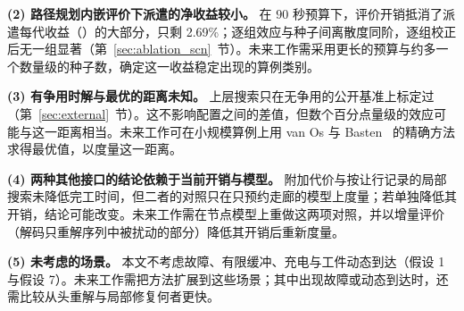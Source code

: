 \documentclass[manuscript,screen,review]{acmart}
\newcommand{\GainProbeLoop}{2.69\%}      %
\begin{document}
\textbf{(2) 路径规划内嵌评价下派遣的净收益较小。}
在 $90$ 秒预算下，评价开销抵消了派遣每代收益（\SameGenGainAbs{}）的大部分，只剩 \GainProbeLoop{}；逐组效应与种子间离散度同阶，逐组校正后无一组显著（第~\ref{sec:ablation_scn}~节）。未来工作需采用更长的预算与约多一个数量级的种子数，确定这一收益稳定出现的算例类别。

\textbf{(3) 有争用时解与最优的距离未知。}
上层搜索只在无争用的公开基准上标定过（第~\ref{sec:external}~节）。这不影响配置之间的差值，但数个百分点量级的效应可能与这一距离相当。未来工作可在小规模算例上用 van Os 与 Basten~\cite{vanos2026exact} 的精确方法求得最优值，以度量这一距离。

\textbf{(4) 两种其他接口的结论依赖于当前开销与模型。}
附加代价与按让行记录的局部搜索未降低完工时间，但二者的对照只在只预约走廊的模型上度量；若单独降低其开销，结论可能改变。未来工作需在节点模型上重做这两项对照，并以增量评价（解码只重解序列中被扰动的部分）降低其开销后重新度量。

\textbf{(5) 未考虑的场景。}
本文不考虑故障、有限缓冲、充电与工件动态到达（假设 1 与假设 7）。未来工作需把方法扩展到这些场景；其中出现故障或动态到达时，还需比较从头重解与局部修复何者更快。




\renewcommand{\refname}{参考文献}



\end{document}
